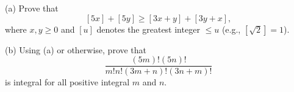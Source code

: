(a) Prove that \[ [5x]+[5y] \ge [3x+y] + [3y+x],\] where $ x,y \ge 0$ and $ [u]$ denotes the greatest integer $ \le u$ (e.g., $ [\sqrt{2}]=1$).

(b) Using (a) or otherwise, prove that \[ \frac{(5m)!(5n)!}{m!n!(3m+n)!(3n+m)!}\] is integral for all positive integral $ m$ and $ n$.